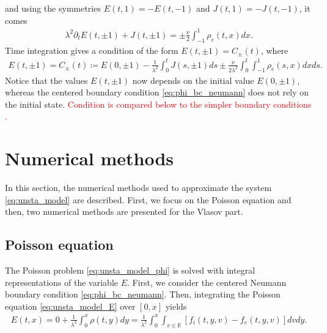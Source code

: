\documentclass{article}
\numberwithin{equation}{section}
\newcommand{\R}{\mathbb{R}}
\begin{document}
and using the symmetries $E(t,1)=-E(t, -1)$ and  $J(t,1)=-J(t, -1)$, it comes 
\begin{align}\label{eq:ampere_bc}
	\lambda^2\partial_t E(t, \pm 1) + J(t, \pm 1)  = \pm \frac{\nu}{2} \int_{-1}^1 \rho_e (t, x)dx.
\end{align}
Time integration gives a condition of the form $E(t,\pm 1) = C_{\pm}(t)$, where %
\begin{align}\label{eq:phi_bc_ampere}
	E(t,\pm 1) = C_{\pm} (t) \coloneqq E(0,\pm1) - \frac{1}{\lambda^2} \int_0^t J (s, \pm1) ds \pm \frac{\nu}{2 \lambda^2}\int_0^t  \int_{-1}^1 \rho_e (s, x) dx ds. 
\end{align}
Notice that the values $E(t,\pm 1)$ now depends on the initial value $E(0,\pm1)$, whereas the centered boundary condition \cref{eq:phi_bc_neumann} does not rely on the initial state. \textcolor{red}{Condition  is compared below to the simpler boundary conditions .}


\section{Numerical methods}\label{sec:nummethods}
In this section, the numerical methods used to approximate the system \cref{eq:unsta_model} are described. 
First, we focus on the Poisson equation and  then, two numerical methods are presented for the Vlasov part. 

\subsection{Poisson equation}\label{ssec:poisson}
 The Poisson problem \cref{eq:unsta_model_phi} is solved with integral representations of the variable $E$.
First, we consider the centered Neumann boundary condition \cref{eq:phi_bc_neumann}. Then, integrating the Poisson equation \cref{eq:unsta_model_E} over $[0,x]$ yields
\begin{align}\label{eq:integral_representation_E_sym}
	E(t,x) = 0 + {\frac{1}{\lambda^2}} \int_0^x \rho(t,y) dy = {\frac{1}{\lambda^2}}\int_0^x \int_{v\in\R} [f_i(t,y,v) - f_e(t,y,v)] dv dy.
\end{align}
\end{document}

